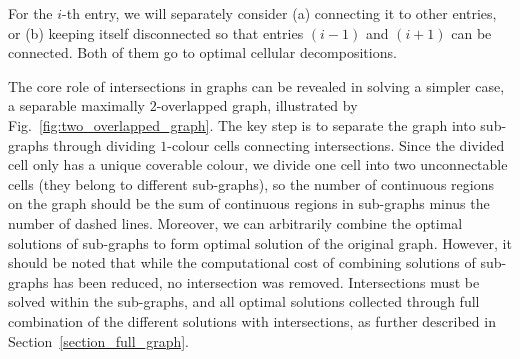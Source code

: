 \documentclass[conference]{IEEEtran}
\begin{document}
For the $i$-th entry, we will separately consider (a) connecting it to other entries, or (b) keeping itself disconnected so that entries $(i-1)$ and $(i+1)$ can be connected. Both of them go to optimal cellular decompositions. 

The core role of intersections in graphs can be revealed in solving a simpler case, a separable maximally $2$-overlapped graph, 
illustrated by Fig.~\ref{fig:two_overlapped_graph}.  
The key step is to separate the graph into sub-graphs through dividing $1$-colour cells connecting intersections. 
Since the divided cell only has a unique coverable colour, we divide one cell into two unconnectable cells (they belong to different sub-graphs), so the number of continuous regions on the graph should be the sum of continuous regions in sub-graphs minus the number of dashed lines. 
Moreover, we can arbitrarily combine the optimal solutions of sub-graphs to form optimal solution of the original graph. 
However, it should be noted that while the computational cost of combining solutions of sub-graphs has been reduced, no intersection was removed. 
Intersections must be solved within the sub-graphs, and all optimal solutions collected through full combination of the different solutions with 
intersections, as further described in Section~\ref{section_full_graph}.
\end{document}
